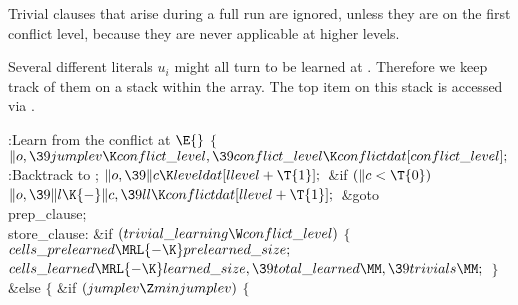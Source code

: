 Trivial clauses that arise during a full run are ignored,
unless they are
on the first conflict level, because they are never applicable
at higher levels.

Several different literals $u_i$ might all turn to be learned at
. Therefore we keep track of them on a stack within the
 array. The top item on this stack is accessed via .

\Y\B\4:Learn from the conflict at \X${}\E{}$\6
${}\{{}$\1\6
${}\|o,\39\\{jumplev}\K\\{conflict\_level},\39\\{conflict\_level}\K%
\\{conflictdat}[\\{conflict\_level}];{}$\6
:Backtrack to \X;\6
${}\|o,\39\|c\K\\{leveldat}[\\{llevel}+\T{1}];{}$\6
\&{if} ${}(\|c<\T{0}){}$\1\5
${}\|o,\39\|l\K{-}\|c,\39\\{ll}\K\\{conflictdat}[\\{llevel}+\T{1}];{}$\2\6
\&{goto} \\{prep\_clause};\6
\4\\{store\_clause}:\5
\6
\&{if} ${}(\\{trivial\_learning}\W\\{conflict\_level}){}$\5
${}\{{}$\1\6
${}\\{cells\_prelearned}\MRL{-{\K}}\\{prelearned\_size};{}$\6
${}\\{cells\_learned}\MRL{-{\K}}\\{learned\_size},\39\\{total\_learned}\MM,\39%
\\{trivials}\MM;{}$\6
\4${}\}{}$\5
\2\&{else}\5
${}\{{}$\1\6
\&{if} ${}(\\{jumplev}\Z\\{minjumplev}){}$\5
${}\{{}$\1\6
